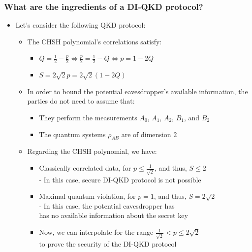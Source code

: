 \documentclass{beamer}
\begin{document}
		\begin{frame}
			\frametitle{\large What are the ingredients of a DI‑QKD protocol?}

            \vspace{3ex}
            \begin{itemize}
                \item Let's consider the following QKD protocol:
                \begin{itemize}
                    \item The CHSH polynomial's correlations satisfy:
                    \begin{itemize}
                        \item $Q = \frac{1}{2} - \frac{p}{2} \Leftrightarrow \frac{p}{2} = \frac{1}{2} - Q \Leftrightarrow p = 1 - 2Q$
                        \item $S = 2 \sqrt{2} p = 2 \sqrt{2} (1 - 2Q)$
                    \end{itemize}
                    \item In order to bound the potential eavesdropper's available information, the parties do not need to assume that:
                    \begin{itemize}
                        \item They perform the measurements ${A}_{0}$, ${A}_{1}$, ${A}_{2}$, ${B}_{1}$, and ${B}_{2}$
                        \item The quantum systems ${\rho}_{AB}$ are of dimension $2$
                    \end{itemize}
                    \item Regarding the CHSH polynomial, we have:
                    \begin{itemize}
                        \item Classically correlated data, for $p \leq \frac{1}{\sqrt{2}}$, and thus, $S \leq 2$\\
                        - In this case, secure DI-QKD protocol is not possible
                        \item Maximal quantum violation, for $p = 1$, and thus, $S = 2\sqrt{2}$\\
                        - In this case, the potential eavesdropper has\\\hspace{0.5em}has no available information about the secret key
                        \item Now, we can interpolate for the range $\frac{1}{\sqrt{2}} < p \leq 2\sqrt{2}$\\ to prove the security of the DI-QKD protocol
                    \end{itemize}
                \end{itemize}
            \end{itemize}
		\end{frame}
\end{document}
